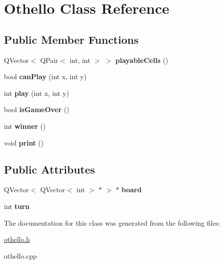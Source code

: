 \hypertarget{classOthello}{}\section{Othello Class Reference}
\label{classOthello}
\subsection*{Public Member Functions}
\begin{DoxyCompactItemize}
\item 
\mbox{\label{classOthello_a1febf06dac396884041ce3faee775258}} 
Q\+Vector$<$ Q\+Pair$<$ int, int $>$ $>$ {\bfseries playable\+Cells} ()
\item 
\mbox{\label{classOthello_acef95d70959467e9146ed34174b66013}} 
bool {\bfseries can\+Play} (int x, int y)
\item 
\mbox{\label{classOthello_a5ca9454e2897ddfa47cd84d9f9c64915}} 
int {\bfseries play} (int x, int y)
\item 
\mbox{\label{classOthello_a6b7a6ede110fba0d5e1819b79780eca3}} 
bool {\bfseries is\+Game\+Over} ()
\item 
\mbox{\label{classOthello_a7b30995e8b7a1a353b0bfac4b0c5f433}} 
int {\bfseries winner} ()
\item 
\mbox{\label{classOthello_a3ca805954be48edcf7fa6aeb1ab01f12}} 
void {\bfseries print} ()
\end{DoxyCompactItemize}
\subsection*{Public Attributes}
\begin{DoxyCompactItemize}
\item 
\mbox{\label{classOthello_a8fafb6457205c4f2fb80e1de7963d700}} 
Q\+Vector$<$ Q\+Vector$<$ int $>$ $\ast$ $>$ $\ast$ {\bfseries board}
\item 
\mbox{\label{classOthello_ac1af16744e1c9d192a62aab789fa08c2}} 
int {\bfseries turn}
\end{DoxyCompactItemize}


The documentation for this class was generated from the following files\+:\begin{DoxyCompactItemize}
\item 
\hyperlink{othello_8h}{othello.\+h}\item 
othello.\+cpp\end{DoxyCompactItemize}
